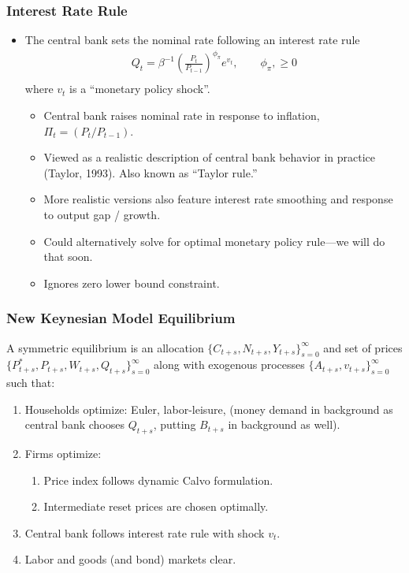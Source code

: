 \documentclass[english,xcolor=svgnames]{beamer}
\begin{document}
\begin{frame}
\frametitle{Interest Rate Rule
}
\begin{itemize}
	\item The central bank sets the nominal rate following an interest rate rule
	\begin{align*}
		Q_t = \beta^{-1}\left(\frac{P_t}{P_{t-1}}\right)^{\phi_{\pi}}e^{v_t},\qquad \phi_\pi, \ge 0 \\
	\end{align*}
	where $v_t$ is a ``monetary policy shock''.
	\begin{itemize}
		\item Central bank raises nominal rate in response to inflation, $\Pi_t=(P_t/P_{t-1})$.
		\item Viewed as a realistic description of central bank behavior in practice (Taylor, 1993). Also known as ``Taylor rule.''
		\item More realistic versions also feature interest rate smoothing and response to output gap / growth.
		\item Could alternatively solve for optimal monetary policy rule---we will do that soon.
		\item Ignores zero lower bound constraint.
	\end{itemize}
\end{itemize}
\end{frame}

\begin{frame}
\frametitle{New Keynesian Model Equilibrium
}
A symmetric equilibrium is an allocation $\{C_{t+s}, N_{t+s},Y_{t+s}\}_{s=0}^{\infty}$ and
set of prices $\{P_{t+s}^*, P_{t+s},W_{t+s},Q_{t+s}\}_{s=0}^{\infty}$ along with exogenous processes $\{A_{t+s},v_{t+s}\}_{s=0}^{\infty}$ such that:
\begin{enumerate}[1.]
	\item Households optimize: Euler, labor-leisure, (money demand in background as central bank chooses $Q_{t+s}$, putting $B_{t+s}$ in background as well).
	\item Firms optimize:
	\begin{enumerate}[2.1]
		\item Price index follows dynamic Calvo formulation.
		\item Intermediate reset prices are chosen optimally.
	\end{enumerate}
	\item Central bank follows interest rate rule with shock $v_t$.
	\item Labor and goods (and bond) markets clear.
\end{enumerate}
\end{frame}
\end{document}
